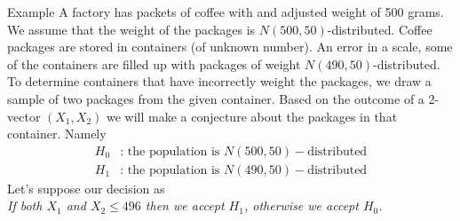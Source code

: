 \documentclass{beamer}
\begin{document}
\begin{frame}{Example}
	A factory has packets of coffee with and adjusted weight of 500 grams. We assume that the weight of the packages is $N(500,50)$-distributed. Coffee packages are stored in containers (of unknown number). An error in a scale, some of the containers are filled up with packages of weight $N(490,50)$-distributed. To determine containers that have incorrectly weight the packages, we draw a sample of two packages from the given container. Based on the outcome of a 2-vector $(X_1,X_2)$ we will make a conjecture about the packages in that container. Namely
	\begin{equation*}
		\begin{split}
			H_0 & \text{: the population is } N(500,50)-\text{distributed}\\
			H_1 & \text{: the population is } N(490,50)-\text{distributed}
		\end{split}
	\end{equation*}
	Let's suppose our decision as\\
	\textit{If both $X_1$ and $X_2 \le 496$ then we accept $H_1$, otherwise we accept $H_0$. }
\end{frame}
\end{document}
